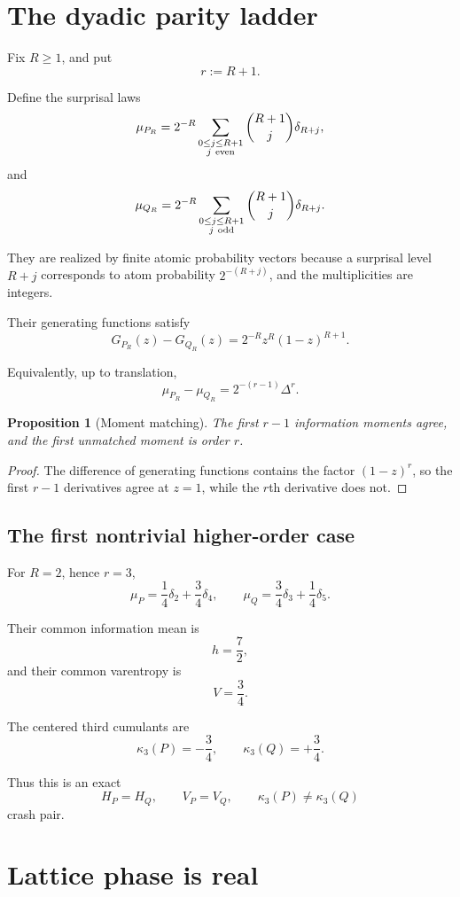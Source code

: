 \documentclass[11pt,a4paper]{article}
\newtheorem{proposition}[theorem]{Proposition}
\newcommand{\cumul}{\kappa}
\begin{document}
\section{The dyadic parity ladder}

Fix \(R\ge1\), and put
\[
r:=R+1.
\]

Define the surprisal laws
\[
\mu_{P_R}
=
2^{-R}
\sum_{\substack{0\le j\le R+1\\ j\ {\rm even}}}
\binom{R+1}{j}\delta_{R+j},
\]
and
\[
\mu_{Q_R}
=
2^{-R}
\sum_{\substack{0\le j\le R+1\\ j\ {\rm odd}}}
\binom{R+1}{j}\delta_{R+j}.
\]

They are realized by finite atomic probability vectors because a surprisal
level \(R+j\) corresponds to atom probability \(2^{-(R+j)}\), and the
multiplicities are integers.

Their generating functions satisfy
\[
G_{P_R}(z)-G_{Q_R}(z)
=
2^{-R}z^R(1-z)^{R+1}.
\]

Equivalently, up to translation,
\[
\boxed{
\mu_{P_R}-\mu_{Q_R}
=
2^{-(r-1)}\Delta^r.
}
\]

\begin{proposition}[Moment matching]
The first \(r-1\) information moments agree, and the first unmatched moment
is order \(r\).
\end{proposition}

\begin{proof}
The difference of generating functions contains the factor
\((1-z)^r\), so the first \(r-1\) derivatives agree at \(z=1\), while the
\(r\)th derivative does not.
\end{proof}

\subsection{The first nontrivial higher-order case}

For \(R=2\), hence \(r=3\),
\[
\boxed{
\mu_P
=
\frac14\delta_2+\frac34\delta_4,
\qquad
\mu_Q
=
\frac34\delta_3+\frac14\delta_5.
}
\]

Their common information mean is
\[
h=\frac72,
\]
and their common varentropy is
\[
V=\frac34.
\]

The centered third cumulants are
\[
\cumul_3(P)=-\frac34,
\qquad
\cumul_3(Q)=+\frac34.
\]

Thus this is an exact
\[
H_P=H_Q,\qquad V_P=V_Q,\qquad \cumul_3(P)\ne\cumul_3(Q)
\]
crash pair.

\section{Lattice phase is real}
\end{document}
